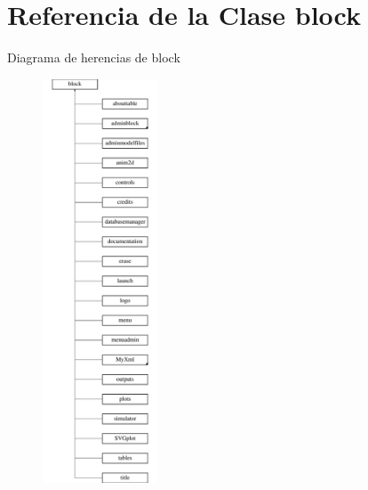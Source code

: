 \hypertarget{classblock}{}\section{Referencia de la Clase block}
\label{classblock}
Diagrama de herencias de block\begin{figure}[H]
\begin{center}
\leavevmode
\includegraphics[height=12.000000cm]{classblock}
\end{center}
\end{figure}
